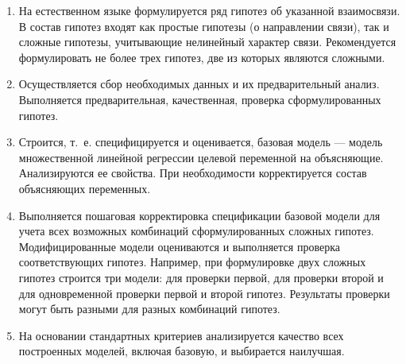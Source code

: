 \documentclass[12pt]{article}
\begin{document}
\begin{enumerate}
        \item На естественном языке формулируется ряд гипотез об указанной взаимосвязи. В состав гипотез входят как простые гипотезы (о направлении связи), так и сложные гипотезы, учитывающие нелинейный характер связи. Рекомендуется формулировать не более трех гипотез, две из которых являются сложными.
        \item Осуществляется сбор необходимых данных и их предварительный анализ. Выполняется предварительная, качественная, проверка сформулированных гипотез.
        \item Строится, т.~е. специфицируется и оценивается, базовая модель --- модель множественной линейной регрессии целевой переменной на объясняющие. Анализируются ее свойства. При необходимости корректируется состав объясняющих переменных.
        \item Выполняется пошаговая корректировка спецификации базовой модели для учета всех возможных комбинаций сформулированных сложных гипотез. Модифицированные модели оцениваются и выполняется проверка соответствующих гипотез. Например, при формулировке двух сложных гипотез строится три модели: для проверки первой, для проверки второй и для одновременной проверки первой и второй гипотез. Результаты проверки могут быть разными для разных комбинаций гипотез.
        \item На основании стандартных критериев анализируется качество всех построенных моделей, включая базовую, и выбирается наилучшая.
\end{enumerate}
\end{document}
